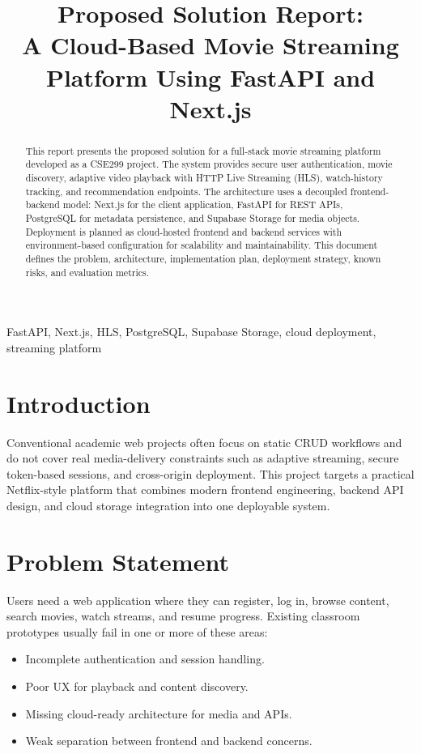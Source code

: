 \documentclass[conference]{IEEEtran}
\title{Proposed Solution Report:\\A Cloud-Based Movie Streaming Platform Using FastAPI and Next.js}
\author{
\IEEEauthorblockN{Mustakim Ahmed Hasan}
\IEEEauthorblockA{
Department of Computer Science and Engineering\\
North South University\\
Email: mustakimahmedhasan@gmail.com
}
}
\begin{document}
\maketitle

\begin{abstract}
This report presents the proposed solution for a full-stack movie streaming platform developed as a CSE299 project. The system provides secure user authentication, movie discovery, adaptive video playback with HTTP Live Streaming (HLS), watch-history tracking, and recommendation endpoints. The architecture uses a decoupled frontend-backend model: Next.js for the client application, FastAPI for REST APIs, PostgreSQL for metadata persistence, and Supabase Storage for media objects. Deployment is planned as cloud-hosted frontend and backend services with environment-based configuration for scalability and maintainability. This document defines the problem, architecture, implementation plan, deployment strategy, known risks, and evaluation metrics.
\end{abstract}

\begin{IEEEkeywords}
FastAPI, Next.js, HLS, PostgreSQL, Supabase Storage, cloud deployment, streaming platform
\end{IEEEkeywords}

\section{Introduction}
Conventional academic web projects often focus on static CRUD workflows and do not cover real media-delivery constraints such as adaptive streaming, secure token-based sessions, and cross-origin deployment. This project targets a practical Netflix-style platform that combines modern frontend engineering, backend API design, and cloud storage integration into one deployable system.

\section{Problem Statement}
Users need a web application where they can register, log in, browse content, search movies, watch streams, and resume progress. Existing classroom prototypes usually fail in one or more of these areas:
\begin{itemize}
\item Incomplete authentication and session handling.
\item Poor UX for playback and content discovery.
\item Missing cloud-ready architecture for media and APIs.
\item Weak separation between frontend and backend concerns.
\end{itemize}
\end{document}
